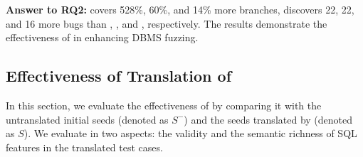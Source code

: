 \documentclass[sigconf,review,anonymous]{acmart}
\begin{document}



\begin{answerbox}
\textbf{Answer to RQ2:} \tool{} covers 528\%, 60\%, and 14\% more branches, discovers 22, 22, and 16 more bugs than \sqlancer{}, \squirrel{}, and \sedar{}, respectively. 
The results demonstrate the effectiveness of \tool{} in enhancing DBMS fuzzing.
\end{answerbox}

\subsection{Effectiveness of Translation of \tool{}}
In this section, we evaluate the effectiveness of \tool{} by comparing it with the untranslated initial seeds (denoted as $S^-$) and the seeds translated by \sedar{} (denoted as $S$). 
We evaluate in two aspects: the validity and the semantic richness of SQL features in the translated test cases.
\end{document}
